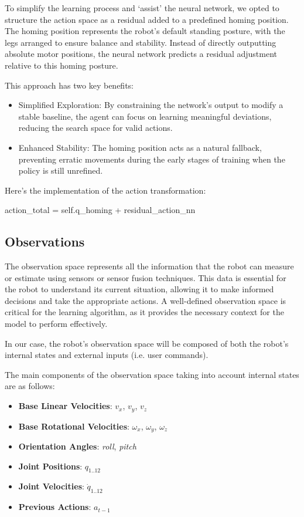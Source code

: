 To simplify the learning process and `assist' the neural network, we opted to structure the action space as a residual added to a predefined homing position. The homing position represents the robot's default standing posture, with the legs arranged to ensure balance and stability. Instead of directly outputting absolute motor positions, the neural network predicts a residual adjustment relative to this homing posture.

This approach has two key benefits:
\begin{itemize}
	\item Simplified Exploration: By constraining the network’s output to modify a stable baseline, the agent can focus on learning meaningful deviations, reducing the search space for valid actions.
	\item Enhanced Stability: The homing position acts as a natural fallback, preventing erratic movements during the early stages of training when the policy is still unrefined.
\end{itemize}

Here’s the implementation of the action transformation:
\begin{pythoncode}
	action_total = self.q_homing + residual_action_nn
\end{pythoncode}

\subsection{Observations}

The observation space represents all the information that the robot can measure or estimate using sensors or sensor fusion techniques. This data is essential for the robot to understand its current situation, allowing it to make informed decisions and take the appropriate actions. A well-defined observation space is critical for the learning algorithm, as it provides the necessary context for the model to perform effectively.

In our case, the robot's observation space will be composed of both the robot's internal states and external inputs (i.e. user commands).

The main components of the observation space taking into account internal states are as follows:
\begin{itemize}
	\item \textbf{Base Linear Velocities}: $v_x$, $v_y$, $v_z$
	\item \textbf{Base Rotational Velocities}: $\omega_x$, $\omega_y$, $\omega_z$
	\item \textbf{Orientation Angles}: \textit{roll}, \textit{pitch}
	\item \textbf{Joint Positions}: $q_{1..12}$
	\item \textbf{Joint Velocities}: $\dot{q}_{1..12}$
	\item \textbf{Previous Actions}: $a_{t-1}$
\end{itemize}

